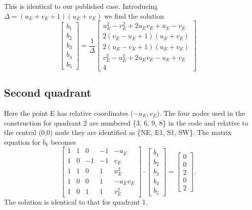 \documentclass[12pt,letterpaper,margin=0.5in]{article}
\begin{document}
This is identical to our published case.  Introducing $\Delta = \left (u_E + v_E + 1 \right)\left (u_E + v_E\right)$ we find
the solution
\begin{equation}
\left[ {\begin{array}{*{20}{c}}
{{b_1}}\\
{{b_2}}\\
{{b_3}}\\
{{b_4}}\\
{{b_5}}
\end{array}} \right] = \frac{1}{\Delta }\left[ {\begin{array}{*{20}{c}}
{u_E^2 - v_E^2 + 2{u_E}{v_E} + {u_E} - {v_E}}\\[4pt]
{2\left( {{v_E} - {u_E} + 1} \right)\left( {{u_E} + {v_E}} \right)}\\[4pt]
{2\left( {{u_E} - {v_E} + 1} \right)\left( {{u_E} + {v_E}} \right)}\\[4pt]
{v_E^2 - u_E^2 + 2{u_E}{v_E} - {u_E} + {v_E}}\\[4pt]
4
\end{array}} \right]
\label{eq:upper}
\end{equation}
\subsection{Second quadrant}
Here the point E has relative coordinates ($-u_E, v_E$).  The four nodes used in the
construction for quadrant 2 are numbered \{3, 6, 9, 8\} in the code and relative to the central (0,0) node they
are identified as \{NE, E1, S1, SW\}. The matrix equation for $b_k$ becomes
\begin{equation}
\left[ {\begin{array}{*{20}{r}}
1&1&0&{ - 1}&{ - {u_E}}\\
1&0&{ - 1}&{ - 1}&{{v_E}}\\
1&1&0&1&{u_E^2}\\
1&0&0&1&{ - {u_E}{v_E}}\\
1&0&1&1&{v_E^2}
\end{array}} \right] \cdot \left[ {\begin{array}{*{20}{c}}
{{b_1}}\\
{{b_2}}\\
{{b_3}}\\
{{b_4}}\\
{{b_5}}
\end{array}} \right] = \left[ {\begin{array}{*{20}{c}}
0\\
0\\
2\\
0\\
2
\end{array}} \right].
\end{equation}
The solution is identical to that for quadrant 1.
\end{document}
